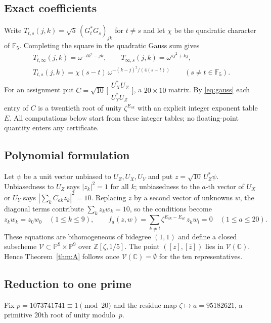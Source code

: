 \documentclass[11pt]{article}
\theoremstyle{definition}
\theoremstyle{remark}
\newcommand{\C}{\mathbb{C}}
\newcommand{\Z}{\mathbb{Z}}
\newcommand{\F}{\mathbb{F}}
\newcommand{\PP}{\mathbb{P}}
\begin{document}
\subsection{Exact coefficients}
Write $T_{t,s}(j,k)=\sqrt5\,(G_t^*G_s)_{jk}$ for $t\neq s$ and let $\chi$ be the quadratic character of $\F_5$.
Completing the square in the quadratic Gauss sum gives
\begin{equation}\label{eq:gauss}
\begin{gathered}
T_{t,\infty}(j,k)=\omega^{-tk^2-jk},\qquad T_{\infty,s}(j,k)=\omega^{sj^2+kj},\\
T_{t,s}(j,k)=\chi(s-t)\,\omega^{-(k-j)^2/(4(s-t))}\qquad(s\neq t\in\F_5).
\end{gathered}
\end{equation}
For an assignment put $C=\sqrt{10}\,\bigl[\begin{smallmatrix}U_X^*U_Z\\ U_Y^*U_Z\end{smallmatrix}\bigr]$, a
$20\times10$ matrix. By \eqref{eq:gauss} each entry of $C$ is a twentieth root of unity $\zeta^{E_{ak}}$ with an
explicit integer exponent table $E$. All computations below start from these integer tables; no floating-point
quantity enters any certificate.

\subsection{Polynomial formulation}
Let $\psi$ be a unit vector unbiased to $U_Z,U_X,U_Y$ and put $z=\sqrt{10}\,U_Z^*\psi$. Unbiasedness to $U_Z$ says
$|z_k|^2=1$ for all $k$; unbiasedness to the $a$-th vector of $U_X$ or $U_Y$ says $|\sum_kC_{ak}z_k|^2=10$. Replacing
$\overline{z}$ by a second vector of unknowns $w$, the diagonal terms contribute $\sum_kz_kw_k=10$, so the conditions
become
\begin{equation}\label{eq:system}
z_kw_k=z_0w_0\quad(1\le k\le 9),\qquad
f_a(z,w)=\sum_{k\neq l}\zeta^{E_{ak}-E_{al}}\,z_kw_l=0\quad(1\le a\le 20).
\end{equation}
These equations are bihomogeneous of bidegree $(1,1)$ and define a closed subscheme $\mathcal V\subset\PP^9\times\PP^9$
over $\Z[\zeta,1/5]$. The point $([z],[\overline z])$ lies in $\mathcal V(\C)$. Hence Theorem~\ref{thm:A} follows once
$\mathcal V(\C)=\emptyset$ for the ten representatives.

\subsection{Reduction to one prime}
Fix $p=1073741741\equiv1\pmod{20}$ and the residue map $\zeta\mapsto a=95182621$, a primitive $20$th root of unity
modulo~$p$.
\end{document}
